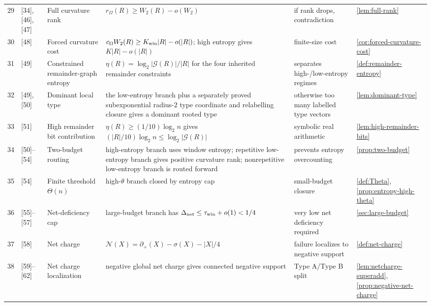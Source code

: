 \documentclass[11pt]{article}
\newcommand{\defp}{\partial_+}
\newcommand{\No}{\mathcal N}
\begin{document}
{\begin{longtable}{C{0.04\textwidth} L{0.13\textwidth} L{0.17\textwidth} L{0.25\textwidth} L{0.21\textwidth} L{0.12\textwidth}}
29 & [34], [46], [47] & Full curvature rank & $r_\Omega(R)\ge W_2(R)-o(W_2)$ & if rank drops, contradiction & \cref{lem:full-rank} \\
30 & [48] & Forced curvature cost & $c_\Omega W_2(R)\ge K_{\rm win}|R|-o(|R|)$; high entropy gives $K|R|-o(|R|)$ & finite-size cost & \cref{cor:forced-curvature-cost} \\
31 & [49] & Constrained remainder-graph entropy & $\eta(R)=\log_2|\mathcal G(R)|/|R|$ for the four inherited remainder constraints & separates high-/low-entropy regimes & \cref{def:remainder-entropy} \\
32 & [49], [50] & Dominant local type & the low-entropy branch plus a separately proved subexponential radius-$2$ type coordinate and relabelling closure gives a dominant rooted type & otherwise too many labelled type vectors & \cref{lem:dominant-type} \\
33 & [51] & High remainder bit contribution & $\eta(R)\ge(1/10)\log_2n$ gives $(|R|/10)\log_2n\le\log_2|\mathcal G(R)|$ & symbolic real arithmetic & \cref{lem:high-remainder-bits} \\
34 & [50]--[54] & Two-budget routing & high-entropy branch uses window entropy; repetitive low-entropy branch gives positive curvature rank; nonrepetitive low-entropy branch is routed forward & prevents entropy overcounting & \cref{prop:two-budget} \\
35 & [54] & Finite threshold $\Theta(n)$ & high-$\theta$ branch closed by entropy cap & small-budget closure & \cref{def:Theta}, \cref{prop:entropy-high-theta} \\
36 & [55]--[57] & Net-deficiency cap & large-budget branch has $\Delta_{\mathrm{net}}\le\tau_{\rm win}+o(1)<1/4$ & very low net deficiency required & \cref{sec:large-budget} \\
37 & [58] & Net charge & $\No(X)=\defp(X)-\sigma(X)-|X|/4$ & failure localizes to negative support & \cref{def:net-charge} \\
38 & [59]--[62] & Net charge localization & negative global net charge gives connected negative support & Type A/Type B split & \cref{lem:netcharge-superadd}, \cref{prop:negative-net-charge} \\

\end{longtable}}
\end{document}
